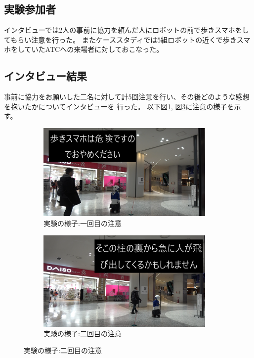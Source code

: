 \documentclass{kuisthesis}
\begin{document}
\subsection{実験参加者}
インタビューでは2人の事前に協力を頼んだ人にロボットの前で歩きスマホをしてもらい注意を行った。
またケーススタディでは5組ロボットの近くで歩きスマホをしていたATCへの来場者に対しておこなった。

\subsection{インタビュー結果}
事前に協力をお願いした二名に対して計5回注意を行い、その後どのような感想を抱いたかについてインタビューを
行った。
以下図\ref{fig: Experimentjani}, 図\ref{fig: Experimentjani2}に注意の様子を示す。
\begin{figure}[H]

  \begin{subfigure}{0.5\textwidth}
    \centering
    \includegraphics[width=0.95\textwidth]{img/jani2.png}
    \caption{実験の様子:一回目の注意}
    \label{fig: Experimentjani}
  \end{subfigure}
  \begin{subfigure}{0.5\textwidth}
    \centering
    \includegraphics[width=0.95\textwidth]{img/jani3.png}
    \caption{実験の様子:二回目の注意}
    \label{fig: Experimentjani2}
  \end{subfigure}
\end{figure}
\end{document}
